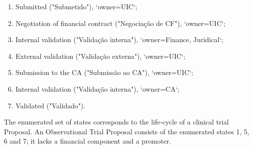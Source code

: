 \begin{enumerate}
    \item Submitted ("Submetido"), `owner=UIC`;
    \item Negotiation of financial contract ("Negociação de CF"), `owner=UIC`;
    \item Internal validation ("Validação interna"), `owner=Finance, Juridical`;
    \item External validation ("Validação externa"), `owner=UIC`;
    \item Submission to the CA ("Submissão ao CA"), `owner=UIC`;
    \item Internal validation ("Validação interna"), `owner=CA`;
    \item Validated ("Validado").
\end{enumerate}

The enumerated set of states corresponds to the life-cycle of a clinical trial Proposal. An Observational Trial Proposal consists of the enumerated states 1, 5, 6 and 7; it lacks a financial component and a promoter.  

